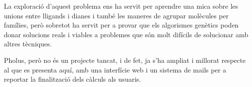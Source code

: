 La exploració d'aquest problema ens ha servit per aprendre una mica sobre
les unions entre lligands i dianes i també les maneres de agrupar molècules per
famílies, però sobretot ha servit per a provar que els algorismes genètics poden
donar solucions reals i viables a problemes que són molt difícils de solucionar
amb altres tècniques.

Pholus, però no és un projecte tancat, i de fet, ja s'ha ampliat i millorat
respecte al que es presenta aquí, amb una interfície web i un sistema de mails
per a reportar la finalització dels càlculs als usuaris.

%
